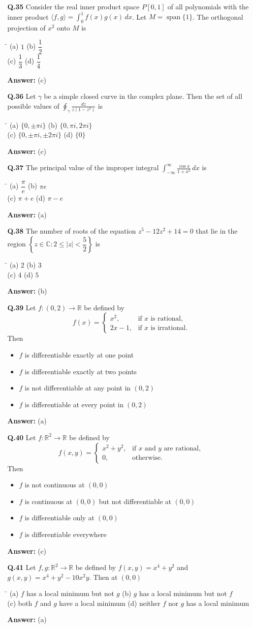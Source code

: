 \documentclass[11pt,a4paper]{article}
\newcommand{\optsfour}[4]{%
  \begin{tabbing}
    \hspace{0.48\linewidth}\=\kill
    (a) #1 \> (b) #2 \\[2pt]
    (c) #3 \> (d) #4
  \end{tabbing}%
}
\newcommand{\optslist}[4]{%
  \begin{itemize}
    \setlength{\itemsep}{2pt}\setlength{\parskip}{0pt}
    \item[(a)] #1
    \item[(b)] #2
    \item[(c)] #3
    \item[(d)] #4
  \end{itemize}%
}
\newcommand{\ans}[1]{\textbf{Answer:} #1\par\medskip}
\begin{document}
\textbf{Q.35} Consider the real inner product space $P[0,1]$ of all polynomials with the inner product $\langle f, g \rangle = \displaystyle\int_0^1 f(x)g(x)\,dx$. Let $M = \operatorname{span}\{1\}$. The orthogonal projection of $x^2$ onto $M$ is
\optsfour{$1$}{$\dfrac{1}{2}$}{$\dfrac{1}{3}$}{$\dfrac{1}{4}$}
\ans{(c)}

\textbf{Q.36} Let $\gamma$ be a simple closed curve in the complex plane. Then the set of all possible values of $\displaystyle\oint_\gamma \frac{dz}{z(1 - z^2)}$ is
\optsfour{$\{0, \pm\pi i\}$}{$\{0, \pi i, 2\pi i\}$}{$\{0, \pm\pi i, \pm 2\pi i\}$}{$\{0\}$}
\ans{(c)}

\textbf{Q.37} The principal value of the improper integral $\displaystyle\int_{-\infty}^{\infty} \frac{\cos x}{1 + x^2}\,dx$ is
\optsfour{$\dfrac{\pi}{e}$}{$\pi e$}{$\pi + e$}{$\pi - e$}
\ans{(a)}

\textbf{Q.38} The number of roots of the equation $z^5 - 12z^2 + 14 = 0$ that lie in the region $\left\{z \in \mathbb{C} : 2 \le |z| < \dfrac{5}{2}\right\}$ is
\optsfour{$2$}{$3$}{$4$}{$5$}
\ans{(b)}

\textbf{Q.39} Let $f : (0, 2) \to \mathbb{R}$ be defined by
\[
  f(x) = \begin{cases} x^2, & \text{if } x \text{ is rational}, \\ 2x - 1, & \text{if } x \text{ is irrational}. \end{cases}
\]
Then
\optslist{$f$ is differentiable exactly at one point}{$f$ is differentiable exactly at two points}{$f$ is not differentiable at any point in $(0, 2)$}{$f$ is differentiable at every point in $(0, 2)$}
\ans{(a)}

\textbf{Q.40} Let $f : \mathbb{R}^2 \to \mathbb{R}$ be defined by
\[
  f(x,y) = \begin{cases} x^2 + y^2, & \text{if } x \text{ and } y \text{ are rational}, \\ 0, & \text{otherwise}. \end{cases}
\]
Then
\optslist{$f$ is not continuous at $(0,0)$}{$f$ is continuous at $(0,0)$ but not differentiable at $(0,0)$}{$f$ is differentiable only at $(0,0)$}{$f$ is differentiable everywhere}
\ans{(c)}

\textbf{Q.41} Let $f, g : \mathbb{R}^2 \to \mathbb{R}$ be defined by $f(x,y) = x^4 + y^2$ and $g(x,y) = x^4 + y^2 - 10x^2 y$. Then at $(0,0)$
\optsfour{$f$ has a local minimum but not $g$}{$g$ has a local minimum but not $f$}{both $f$ and $g$ have a local minimum}{neither $f$ nor $g$ has a local minimum}
\ans{(a)}
\end{document}
